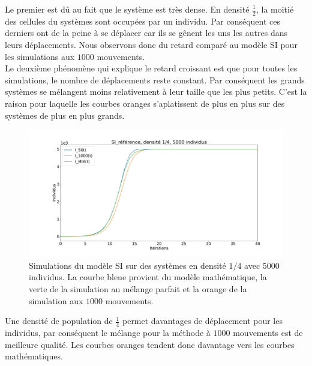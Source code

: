 Le premier est dû au fait que le système est très dense. En densité $\frac{1}{2}$, la moitié des cellules du systèmes sont occupées par un individu. Par conséquent ces derniers ont de la peine à se déplacer car ils se gênent les uns les autres dans leurs déplacements. Nous observons donc du retard comparé au modèle SI pour les simulations aux $1000$ mouvements. \\

Le deuxième phénomène qui explique le retard croissant est que pour toutes les simulations, le nombre de déplacements reste constant. Par conséquent les grands systèmes se mélangent moins relativement à leur taille que les plus petits. C'est la raison pour laquelle les courbes oranges s'aplatissent de plus en plus sur des systèmes de plus en plus grands.\\

\newpage

\begin{figure}[h]
    \centering
    \captionsetup{justification=centering}
    \includegraphics[width=1\textwidth]{Images/SI_ref_4_5k.pdf}
    \caption[Simulations de SI, densité 1/4]{Simulations du modèle SI sur des systèmes en densité $1/4$ avec $5000$ individus. La courbe bleue provient du modèle mathématique, la verte de la simulation au mélange parfait et la orange de la simulation aux $1000$ mouvements.}
\end{figure}

Une densité de population de $\frac{1}{4}$ permet davantages de déplacement pour les individus, par conséquent le mélange pour la méthode à $1000$ mouvements est de meilleure qualité. Les courbes oranges tendent donc davantage vers les courbes mathématiques.

